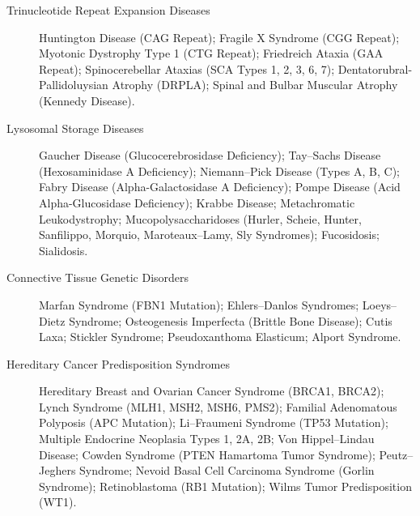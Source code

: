\begin{description}
\item[Trinucleotide Repeat Expansion Diseases] Huntington Disease (CAG Repeat); Fragile X Syndrome (CGG Repeat); Myotonic Dystrophy Type 1 (CTG Repeat); Friedreich Ataxia (GAA Repeat); Spinocerebellar Ataxias (SCA Types 1, 2, 3, 6, 7); Dentatorubral-Pallidoluysian Atrophy (DRPLA); Spinal and Bulbar Muscular Atrophy (Kennedy Disease).

\item[Lysosomal Storage Diseases] Gaucher Disease (Glucocerebrosidase Deficiency); Tay–Sachs Disease (Hexosaminidase A Deficiency); Niemann–Pick Disease (Types A, B, C); Fabry Disease (Alpha-Galactosidase A Deficiency); Pompe Disease (Acid Alpha-Glucosidase Deficiency); Krabbe Disease; Metachromatic Leukodystrophy; Mucopolysaccharidoses (Hurler, Scheie, Hunter, Sanfilippo, Morquio, Maroteaux–Lamy, Sly Syndromes); Fucosidosis; Sialidosis.

\item[Connective Tissue Genetic Disorders] Marfan Syndrome (FBN1 Mutation); Ehlers–Danlos Syndromes; Loeys–Dietz Syndrome; Osteogenesis Imperfecta (Brittle Bone Disease); Cutis Laxa; Stickler Syndrome; Pseudoxanthoma Elasticum; Alport Syndrome.

\item[Hereditary Cancer Predisposition Syndromes] Hereditary Breast and Ovarian Cancer Syndrome (BRCA1, BRCA2); Lynch Syndrome (MLH1, MSH2, MSH6, PMS2); Familial Adenomatous Polyposis (APC Mutation); Li–Fraumeni Syndrome (TP53 Mutation); Multiple Endocrine Neoplasia Types 1, 2A, 2B; Von Hippel–Lindau Disease; Cowden Syndrome (PTEN Hamartoma Tumor Syndrome); Peutz–Jeghers Syndrome; Nevoid Basal Cell Carcinoma Syndrome (Gorlin Syndrome); Retinoblastoma (RB1 Mutation); Wilms Tumor Predisposition (WT1).
\end{description}
